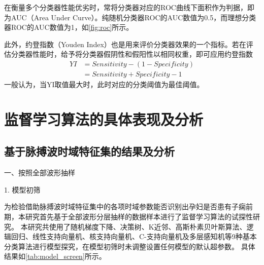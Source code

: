 在衡量多个分类器性能优劣时，常将分类器对应的ROC曲线下面积作为判据，即为AUC（Area Under Curve）。纯随机分类器ROC的AUC数值为0.5，而理想分类器ROC的AUC数值为1，如\autoref{fig:roc}所示。

此外，约登指数（Youden Index）也是用来评价分类器效果的一个指标。若在评估分类器性能时，给予将分类器假阴性和假阳性以相同权重，即可应用约登指数
\begin{equation}
      \label{equ:yi}
      \begin{aligned}
            YI&=Sensitivity-(1-Specificity)\\
            &=Sensitivity+Specificity-1
      \end{aligned}
\end{equation}
一般认为，当YI取值最大时，此时对应的分类阈值为最佳阈值\cite{cwl}。
\section{监督学习算法的具体表现及分析}
\subsection{基于脉搏波时域特征集的结果及分析}
一、按照全部波形抽样

1. 模型初筛

为检验借助脉搏波时域特征集中的各项时域参数能否识别出孕妇是否患有子痫前期，本研究首先基于全部波形分层抽样的数据样本进行了监督学习算法的试探性研究\cite{scikit-learn}。
本研究共使用了随机梯度下降、决策树、K近邻、高斯朴素贝叶斯算法、逻辑回归、线性支持向量机、核支持向量机、C-支持向量机及多层感知机等9种基本分类算法进行模型探究，在模型初筛时未调整设置任何模型的默认超参数\cite{scikit-learn}。
具体结果如\autoref{tab:model_screen}所示。

